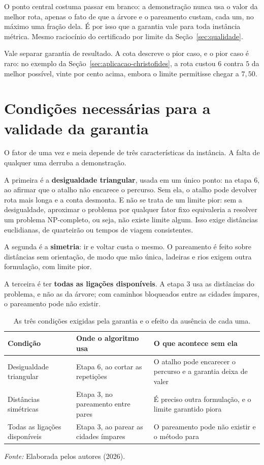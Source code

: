 O ponto central costuma passar em branco: a demonstração nunca usa o valor da
melhor rota, apenas o fato de que a árvore e o pareamento custam, cada um, no
máximo uma fração dela. É por isso que a garantia vale para toda instância
métrica. Mesmo raciocínio do certificado por limite da Seção~\ref{sec:qualidade}.

Vale separar garantia de resultado. A cota descreve o pior caso, e o pior caso é
raro: no exemplo da Seção~\ref{sec:aplicacao-christofides}, a rota custou $6$
contra $5$ da melhor possível, vinte por cento acima, embora o limite permitisse
chegar a $7{,}50$.

\section{Condições necessárias para a validade da garantia}
\label{sec:condicoes-garantia}

O fator de uma vez e meia depende de três características da instância. A falta
de qualquer uma derruba a demonstração.

A primeira é a \textbf{desigualdade triangular}, usada em um único ponto: na
etapa 6, ao afirmar que o atalho não encarece o percurso. Sem ela, o atalho pode
devolver rota mais longa e a conta desmonta. E não se trata de um limite pior:
sem a desigualdade, aproximar o problema por qualquer fator fixo equivaleria a
resolver um problema NP-completo, ou seja, não existe limite algum. Isso exige
distâncias euclidianas, de quarteirão ou tempos de viagem consistentes.

A segunda é a \textbf{simetria}: ir e voltar custa o mesmo. O pareamento é feito
sobre distâncias sem orientação, de modo que mão única, ladeiras e rios exigem
outra formulação, com limite pior.

A terceira é ter \textbf{todas as ligações disponíveis}. A etapa 3 usa as
distâncias do problema, e não as da árvore; com caminhos bloqueados entre as
cidades ímpares, o pareamento pode não existir.

\begin{table}[!ht]
\centering
\caption{As três condições exigidas pela garantia e o efeito da ausência de cada uma.}
\label{tab:condicoes-garantia}
\begin{tabular}{p{4.2cm}p{4.6cm}p{4.8cm}}
\hline
\textbf{Condição} & \textbf{Onde o algoritmo usa} & \textbf{O que acontece sem ela} \\
\hline
Desigualdade triangular & Etapa 6, ao cortar as repetições & O atalho pode encarecer o percurso e a garantia deixa de valer \\
\hline
Distâncias simétricas & Etapa 3, no pareamento entre pares & É preciso outra formulação, e o limite garantido piora \\
\hline
Todas as ligações disponíveis & Etapa 3, ao parear as cidades ímpares & O pareamento pode não existir e o método para \\
\hline
\end{tabular}

\vspace{0.15cm}
\parbox{8.4cm}{\footnotesize\textit{Fonte:} Elaborada pelos autores (2026).}
\end{table}

